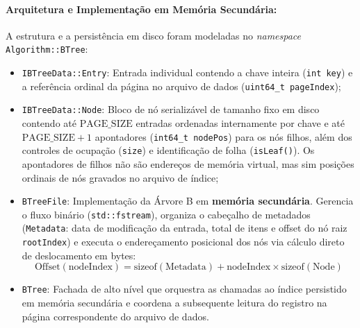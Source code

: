 \documentclass[12pt,a4paper]{article}
\begin{document}
\paragraph{Arquitetura e Implementação em Memória Secundária:}
A estrutura e a persistência em disco foram modeladas no \textit{namespace} \texttt{Algorithm::BTree}:
\begin{itemize}
    \item \texttt{IBTreeData::Entry}: Entrada individual contendo a chave inteira (\texttt{int key}) e a referência ordinal da página no arquivo de dados (\texttt{uint64\_t pageIndex});
    \item \texttt{IBTreeData::Node}: Bloco de nó serializável de tamanho fixo em disco contendo até $\text{PAGE\_SIZE}$ entradas ordenadas internamente por chave e até $\text{PAGE\_SIZE} + 1$ apontadores (\texttt{int64\_t nodePos}) para os nós filhos, além dos controles de ocupação (\texttt{size}) e identificação de folha (\texttt{isLeaf()}). Os apontadores de filhos não são endereços de memória virtual, mas sim posições ordinais de nós gravados no arquivo de índice;
    \item \texttt{BTreeFile}: Implementação da Árvore B em \textbf{memória secundária}. Gerencia o fluxo binário (\texttt{std::fstream}), organiza o cabeçalho de metadados (\texttt{Metadata}: data de modificação da entrada, total de itens e offset do nó raiz \texttt{rootIndex}) e executa o endereçamento posicional dos nós via cálculo direto de deslocamento em bytes:
    \begin{equation}
        \text{Offset}(\text{nodeIndex}) = \text{sizeof}(\text{Metadata}) + \text{nodeIndex} \times \text{sizeof}(\text{Node})
    \end{equation}
    \item \texttt{BTree}: Fachada de alto nível que orquestra as chamadas ao índice persistido em memória secundária e coordena a subsequente leitura do registro na página correspondente do arquivo de dados.
\end{itemize}
\end{document}
